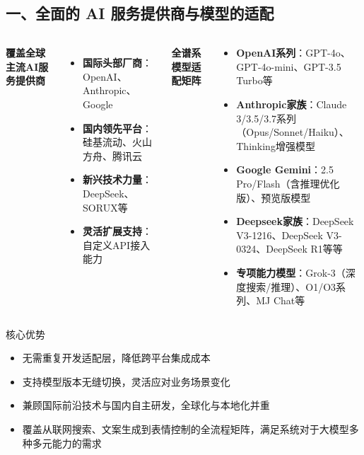 \documentclass{beamer}
\begin{document}
\subsection{一、全面的 AI 服务提供商与模型的适配}
\begin{frame}
    \begin{columns}[T]
        \textbf{覆盖全球主流AI服务提供商}
        \vspace{0.3cm}
        \begin{itemize}
            \item \textbf{国际头部厂商}：OpenAI、Anthropic、Google
            \item \textbf{国内领先平台}：硅基流动、火山方舟、腾讯云
            \item \textbf{新兴技术力量}：DeepSeek、SORUX等
            \item \textbf{灵活扩展支持}：自定义API接入能力
        \end{itemize}

        \textbf{全谱系模型适配矩阵}
        \vspace{0.3cm}
        \begin{small}
            \begin{itemize}
                \item \textbf{OpenAI系列}：GPT-4o、GPT-4o-mini、GPT-3.5 Turbo等
                \item \textbf{Anthropic家族}：Claude 3/3.5/3.7系列（Opus/Sonnet/Haiku）、Thinking增强模型
                \item \textbf{Google Gemini}：2.5 Pro/Flash（含推理优化版）、预览版模型
                \item \textbf{Deepseek家族}：DeepSeek V3-1216、DeepSeek V3-0324、DeepSeek R1等等
                \item \textbf{专项能力模型}：Grok-3（深度搜索/推理）、O1/O3系列、MJ Chat等
            \end{itemize}
        \end{small}
    \end{columns}
\end{frame}

\begin{frame}
    \begin{block}{核心优势}
        \begin{itemize}
            \item 无需重复开发适配层，降低跨平台集成成本
            \item 支持模型版本无缝切换，灵活应对业务场景变化
            \item 兼顾国际前沿技术与国内自主研发，全球化与本地化并重
            \item 覆盖从联网搜索、文案生成到表情控制的全流程矩阵，满足系统对于大模型多种多元能力的需求
        \end{itemize}
    \end{block}
\end{frame}
\end{document}
